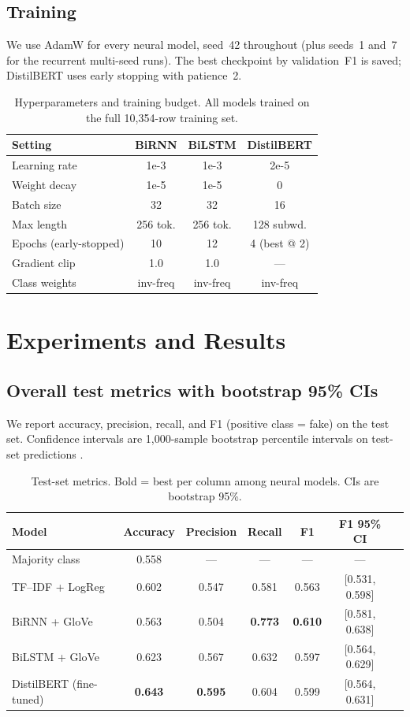 \documentclass{article}
\begin{document}
\subsection{Training}
We use AdamW for every neural model, seed~42 throughout (plus seeds~1 and~7 for the recurrent multi-seed runs). The best checkpoint by validation~F1 is saved; DistilBERT uses early stopping with patience~2.

\begin{table}[h]
\centering
\caption{Hyperparameters and training budget. All models trained on the full 10{,}354-row training set.}
\label{tab:hyperparams}
\small
\begin{tabular}{lccc}
\toprule
Setting & BiRNN & BiLSTM & DistilBERT \\
\midrule
Learning rate & 1e-3 & 1e-3 & 2e-5 \\
Weight decay & 1e-5 & 1e-5 & 0 \\
Batch size & 32 & 32 & 16 \\
Max length & 256 tok. & 256 tok. & 128 subwd. \\
Epochs (early-stopped) & 10 & 12 & 4 (best @ 2) \\
Gradient clip & 1.0 & 1.0 & --- \\
Class weights & inv-freq & inv-freq & inv-freq \\
\bottomrule
\end{tabular}
\end{table}

\section{Experiments and Results}

\subsection{Overall test metrics with bootstrap 95\% CIs}
We report accuracy, precision, recall, and F1 (positive class = fake) on the test set. Confidence intervals are 1{,}000-sample bootstrap percentile intervals on test-set predictions \citep{efron1986bootstrap}.

\begin{table}[h]
\centering
\caption{Test-set metrics. Bold = best per column among neural models. CIs are bootstrap 95\%.}
\label{tab:overall}
\begin{tabular}{lcccccl}
\toprule
Model & Accuracy & Precision & Recall & F1 & F1 95\% CI \\
\midrule
Majority class             & 0.558 & --- & --- & --- & --- \\
TF--IDF + LogReg          & 0.602 & 0.547 & 0.581 & 0.563 & [0.531, 0.598] \\
BiRNN + GloVe             & 0.563 & 0.504 & \textbf{0.773} & \textbf{0.610} & [0.581, 0.638] \\
BiLSTM + GloVe            & 0.623 & 0.567 & 0.632 & 0.597 & [0.564, 0.629] \\
DistilBERT (fine-tuned)   & \textbf{0.643} & \textbf{0.595} & 0.604 & 0.599 & [0.564, 0.631] \\
\bottomrule
\end{tabular}
\end{table}
\end{document}
